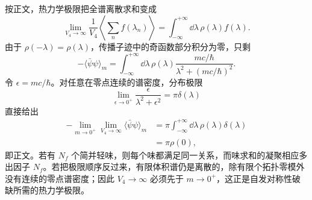 \begin{derivation}
按正文，热力学极限把全谱离散求和变成
\begin{equation*}
 \lim_{V_4\to\infty}
 \frac1{V_4}\left\langle\sum_n f(\lambda_n)\right\rangle
 =\int_{-\infty}^{+\infty}\dd\lambda\,\rho(\lambda)f(\lambda).
\end{equation*}
由于 $\rho(-\lambda)=\rho(\lambda)$，传播子迹中的奇函数部分积分为零，只剩
\begin{equation*}
 -\langle\bar\psi\psi\rangle_m
 =\int_{-\infty}^{+\infty}\dd\lambda\,
 \rho(\lambda)
 \frac{mc/\hbar}{\lambda^2+(mc/\hbar)^2}.
\end{equation*}
令 $\epsilon=mc/\hbar$。对任意在零点连续的谱密度，分布极限
\begin{equation*}
 \lim_{\epsilon\to0^+}
 \frac{\epsilon}{\lambda^2+\epsilon^2}
 =\pi\delta(\lambda)
\end{equation*}
直接给出
\begin{align*}
 -\lim_{m\to0^+}\lim_{V_4\to\infty}
 \langle\bar\psi\psi\rangle_m
 &=\pi\int_{-\infty}^{+\infty}\dd\lambda\,
 \rho(\lambda)\delta(\lambda)\\
 &=\pi\rho(0),
\end{align*}
即正文。若有 $N_f$ 个简并轻味，则每个味都满足同一关系，而味求和的凝聚相应多出因子 $N_f$。若把极限顺序反过来，有限体积谱仍是离散的，除有限个拓扑零模外没有连续的零点谱密度；因此 $V_4\to\infty$ 必须先于 $m\to0^+$，这正是自发对称性破缺所需的热力学极限。
\end{derivation}

